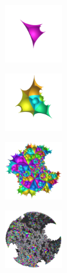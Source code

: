\documentclass[dvipdfmx]{interact}
\theoremstyle{plain}%
\theoremstyle{definition}
\theoremstyle{remark}
\theoremstyle{problemstyle}
\begin{document}
\begin{figure}[H]
 \begin{minipage}[t]{0.18\textwidth}
  \centering
  \includegraphics[width=1in, height=1in, keepaspectratio]{./img/constructFractal/finiteProcess/step1.png}
  \label{fig:sphaira-step1}
 \end{minipage}
 \hspace*{\fill}
 \begin{minipage}[t]{0.18\textwidth}
  \centering
  \includegraphics[width=1in, height=1in, keepaspectratio]{./img/constructFractal/finiteProcess/step2.png}
  \label{fig:sphaira-step2}
 \end{minipage}
 \hspace*{\fill}
 \begin{minipage}[t]{0.18\textwidth}
  \centering
  \includegraphics[width=1in, height=1in, keepaspectratio]{./img/constructFractal/finiteProcess/step5.png}
  \label{fig:sphaira-step5}
 \end{minipage}
 \hspace*{\fill}
 \begin{minipage}[t]{0.18\textwidth}
  \centering
  \includegraphics[width=1in, height=1in, keepaspectratio]{./img/constructFractal/finiteProcess/step10.png}
  \label{fig:sphaira-step10}
 \end{minipage}

\end{figure}
\end{document}
